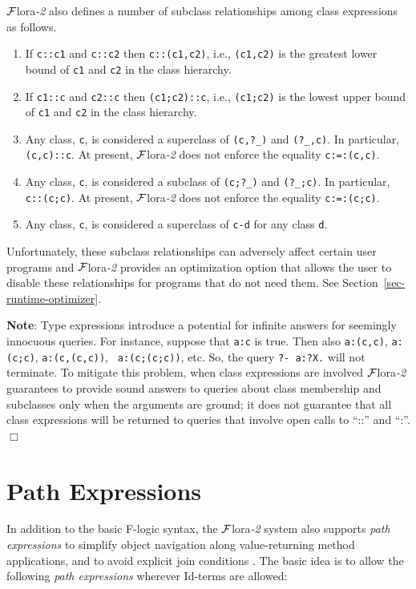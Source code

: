 \documentclass[11pt]{article}
\newcommand{\FLORA}{{\mbox{\sc ${\cal F}${lora}\rm\emph{-2}}}\xspace}
\newcommand{\fl}{\mbox{F-logic}\xspace}
\begin{document}
\FLORA also defines a number of subclass relationships among class
expressions as follows.
\begin{enumerate}
\item If {\tt c::c1} and {\tt c::c2} then {\tt c::(c1,c2)}, i.e.,
  {\tt (c1,c2)} is the greatest lower bound of {\tt c1} and {\tt c2} in the
  class hierarchy.
\item If {\tt c1::c} and {\tt c2::c} then {\tt (c1;c2)::c}, i.e.,
  {\tt (c1;c2)} is the lowest upper bound of {\tt c1} and {\tt c2} in the
  class hierarchy. 
\item Any class, {\tt c}, is considered a superclass of {\tt (c,?\_)} and
  {\tt (?\_,c)}. In particular, {\tt (c,c)::c}. At present, \FLORA does not
  enforce the equality {\tt c:=:(c,c)}.      
\item Any class, {\tt c}, is considered a subclass of {\tt (c;?\_)} and
  {\tt (?\_;c)}. In particular, {\tt c::(c;c)}. At present, \FLORA does not
  enforce the equality {\tt c:=:(c;c)}.      
\item Any class, {\tt c}, is considered a superclass of {\tt c-d} for any
  class {\tt d}.   
\end{enumerate}
Unfortunately, these subclass relationships can adversely affect certain user
programs and \FLORA provides an optimization option that allows the user to
disable these relationships for programs that do not need them. See
Section~\ref{sec-runtime-optimizer}.

\noindent
{\bf Note}: Type expressions introduce a potential for infinite answers
for seemingly innocuous queries. For instance, suppose that {\tt a:c} is
true. Then also {\tt a:(c,c)}, {\tt a:(c;c)}, {\tt a:(c,(c,c))}, {\tt
  a:(c;(c;c))}, etc. So, the query {\tt ?- a:?X.} will not terminate.
To mitigate this problem, when class expressions are involved
\FLORA guarantees to provide sound answers to queries about class
membership and subclasses only when the arguments are ground; it does
not guarantee that all class expressions will be returned to 
queries that involve open calls to ``::'' and ``:''.
\hfill$\Box$



\section{Path Expressions}\label{sec-pathexpr}


 
In addition to the basic \fl syntax, the \FLORA  system also supports
\emph{path expressions} to simplify object navigation along
value-returning method applications, and to avoid
explicit join conditions \cite{frohn-lausen-uphoff-VLDB-94}.  The
basic idea is to allow the following \emph{path expressions} wherever
Id-terms are allowed:
\end{document}
